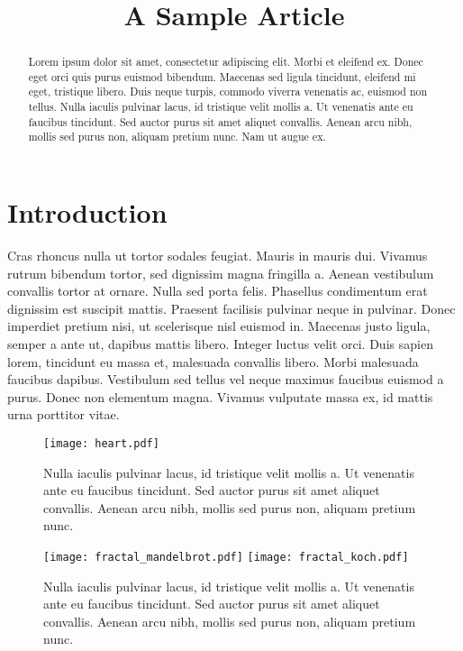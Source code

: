 \documentclass[modern]{aastex62}
\begin{document}
\title{A Sample Article}

\author[\myORCID]{\myName}
\email{\myEmail}
\affil{\myAffil}

\begin{abstract}
    Lorem ipsum dolor sit amet, consectetur adipiscing elit. Morbi et eleifend ex. Donec eget orci quis purus euismod bibendum. Maecenas sed ligula tincidunt, eleifend mi eget, tristique libero. Duis neque turpis, commodo viverra venenatis ac, euismod non tellus. Nulla iaculis pulvinar lacus, id tristique velit mollis a. Ut venenatis ante eu faucibus tincidunt. Sed auctor purus sit amet aliquet convallis. Aenean arcu nibh, mollis sed purus non, aliquam pretium nunc. Nam ut augue ex.
\end{abstract}

\section{Introduction}
Cras rhoncus nulla ut tortor sodales feugiat. Mauris in mauris dui. Vivamus rutrum bibendum tortor, sed dignissim magna fringilla a. Aenean vestibulum convallis tortor at ornare. Nulla sed porta felis. Phasellus condimentum erat dignissim est suscipit mattis. Praesent facilisis pulvinar neque in pulvinar. Donec imperdiet pretium nisi, ut scelerisque nisl euismod in. Maecenas justo ligula, semper a ante ut, dapibus mattis libero. Integer luctus velit orci. Duis sapien lorem, tincidunt eu massa et, malesuada convallis libero. Morbi malesuada faucibus dapibus. Vestibulum sed tellus vel neque maximus faucibus euismod a purus. Donec non elementum magna. Vivamus vulputate massa ex, id mattis urna porttitor vitae.

\begin{figure}[t!]
    \begin{centering}
        \texttt{[image: heart.pdf]}
        \caption{
            Nulla iaculis pulvinar lacus, id tristique velit mollis a. Ut venenatis ante eu faucibus tincidunt. Sed auctor purus sit amet aliquet convallis. Aenean arcu nibh, mollis sed purus non, aliquam pretium nunc.
        }
    \end{centering}
\end{figure}

\begin{figure}[t!]
    \begin{centering}
        \texttt{[image: fractal\_mandelbrot.pdf]}
        \texttt{[image: fractal\_koch.pdf]}
        \caption{
            Nulla iaculis pulvinar lacus, id tristique velit mollis a. Ut venenatis ante eu faucibus tincidunt. Sed auctor purus sit amet aliquet convallis. Aenean arcu nibh, mollis sed purus non, aliquam pretium nunc.
        }
    \end{centering}
\end{figure}

\clearpage

\end{document}
